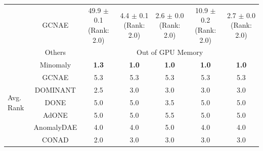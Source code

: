\begin{table}[H]
\begin{tabular}{|l|c|c|c|c|c|c|}
    & GCNAE & \makecell{49.9 $\pm$ 0.1 \\[1pt] \tiny (Rank: 2.0)} & \makecell{4.4 $\pm$ 0.1 \\[1pt] \tiny (Rank: 2.0)} & \makecell{2.6 $\pm$ 0.0 \\[1pt] \tiny (Rank: 2.0)} & \makecell{10.9 $\pm$ 0.2 \\[1pt] \tiny (Rank: 2.0)} & \makecell{2.7 $\pm$ 0.0 \\[1pt] \tiny (Rank: 2.0)} \\ 
    & Others & \multicolumn{5}{c|}{Out of GPU Memory} \\ \hline
    \multirow{7}{*}{Avg. Rank}
    & Minomaly & \textbf{1.3} & \textbf{1.0} & \textbf{1.0} & \textbf{1.0} & \textbf{1.0} \\
    & GCNAE & 5.3 & 5.3 & 5.3 & 5.3 & 5.3 \\
    & DOMINANT & 2.5 & 3.0 & 3.0 & 3.0 & 3.0 \\
    & DONE & 5.0 & 5.0 & 3.5 & 5.0 & 5.0 \\
    & AdONE & 5.0 & 5.0 & 5.5 & 5.0 & 5.0 \\
    & AnomalyDAE & 4.0 & 4.0 & 5.0 & 4.0 & 4.0 \\
    & CONAD & 2.0 & 3.0 & 3.0 & 3.0 & 3.0 \\ \hline
    \end{tabular}
\end{table}